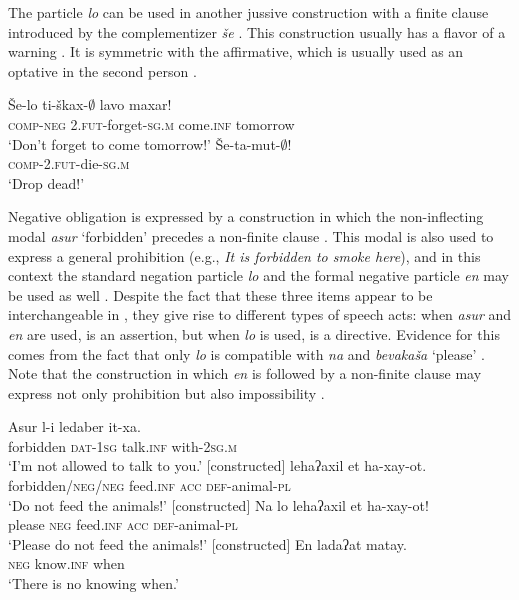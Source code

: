 \documentclass[output=paper,colorlinks,citecolor=brown]{langscibook}
\begin{document}
The particle \textit{lo} can be used in another jussive construction with a finite clause introduced by the complementizer \textit{še} \citep{Bar-Adon1966}. This construction usually has a flavor of a warning . It is symmetric with the affirmative, which is usually used as an optative in the second person .

\ea\label{ex:heb:5} 
    \ea\label{ex:heb:5a}
        \gll Še-lo ti-škax-${\emptyset}$ lavo maxar!\\
             \textsc{comp{}-neg} \textsc{2.fut}{}-forget-\textsc{sg.m} come.\textsc{inf} tomorrow\\
        \glt ‘Don't forget to come tomorrow!' \citep[410]{Bar-Adon1966}
    \ex\label{ex:heb:5b}
        \gll Še-ta-mut-${\emptyset}$!\\
             \textsc{comp{}-2.fut-}die\textsc{{}-sg.m}\\
        \glt ‘Drop dead!' \citep[411]{Bar-Adon1966}
    \z
\z 

Negative obligation is expressed by a construction in which the non-inflecting modal \textit{asur} ‘forbidden’ precedes a non-finite clause . This modal is also used to express a general prohibition (e.g., \textit{It is forbidden to smoke here}), and in this context the standard negation particle \textit{lo} and the formal negative particle \textit{en} may be used as well . Despite the fact that these three items appear to be interchangeable in , they give rise to different types of speech acts: when \textit{asur} and \textit{en} are used,  is an assertion, but when \textit{lo} is used,  is a directive. Evidence for this comes from the fact that only \textit{lo} is compatible with \textit{na} and \textit{bevakaša} ‘please' . Note that the construction in which \textit{en} is followed by a non-finite clause may express not only prohibition  but also impossibility .

\ea\label{ex:heb:6}
    \ea\label{ex:heb:6a}
        \gll Asur l-i ledaber it-xa.\\
             forbidden \textsc{dat-1sg} talk.\textsc{inf} with-\textsc{2sg.m}\\
        \glt ‘I’m not allowed to talk to you.’ [constructed]
    \ex\label{ex:heb:6b}
         lehaʔaxil et ha-xay-ot. \\
             forbidden/\textsc{neg/neg} feed.\textsc{inf} \textsc{acc} \textsc{def}{}-animal-\textsc{pl}\\
        \glt ‘Do not feed the animals!’ [constructed]
    \ex\label{ex:heb:6c}
        \gll Na lo lehaʔaxil et ha-xay-ot!\\
             please \textsc{neg} feed.\textsc{inf} \textsc{acc} \textsc{def}{}-animal-\textsc{pl}\\
        \glt ‘Please do not feed the animals!' [constructed]
    \ex\label{ex:heb:6d}
        \gll En ladaʔat matay.\\
             \textsc{neg} know.\textsc{inf} when\\
        \glt ‘There is no knowing when.' \citep[376]{Tzivoni1993}
    \z
\z 
\end{document}
